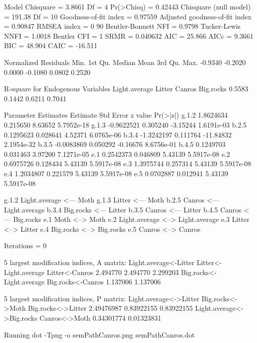 \documentclass[12pt]{article}
\begin{document}
\begin{Schunk}
\begin{Soutput}
 Model Chisquare =  3.8661   Df =  4 Pr(>Chisq) = 0.42443
 Chisquare (null model) =  191.38   Df =  10
 Goodness-of-fit index =  0.97559
 Adjusted goodness-of-fit index =  0.90847
 RMSEA index =  0   90%
 Bentler-Bonnett NFI =  0.9798
 Tucker-Lewis NNFI =  1.0018
 Bentler CFI =  1
 SRMR =  0.040632
 AIC =  25.866
 AICc =  9.3661
 BIC =  48.904
 CAIC =  -16.511

 Normalized Residuals
   Min. 1st Qu.  Median    Mean 3rd Qu.    Max. 
-0.9340 -0.2020  0.0000 -0.1080  0.0802  0.2520 

 R-square for Endogenous Variables
Light.average        Litter        Canros     Big.rocks 
       0.5583        0.1442        0.6211        0.7041 

 Parameter Estimates
      Estimate   Std Error z value   Pr(>|z|)  
g.1.2  1.8624634 0.215650    8.63652 5.7952e-18
g.1.3 -0.9622521 0.305240   -3.15244 1.6191e-03
b.2.5  0.1295623 0.028641    4.52371 6.0765e-06
b.3.4 -1.3242197 0.111764  -11.84832 2.1954e-32
b.3.5 -0.0083869 0.050292   -0.16676 8.6756e-01
b.4.5  0.1249703 0.031463    3.97200 7.1271e-05
e.1    0.2542373 0.046809    5.43139 5.5917e-08
e.2    0.6975726 0.128434    5.43139 5.5917e-08
e.3    1.3975744 0.257314    5.43139 5.5917e-08
e.4    1.2034807 0.221579    5.43139 5.5917e-08
e.5    0.0702887 0.012941    5.43139 5.5917e-08
                                      
g.1.2 Light.average <--- Moth         
g.1.3 Litter <--- Moth                
b.2.5 Canros <--- Light.average       
b.3.4 Big.rocks <--- Litter           
b.3.5 Canros <--- Litter              
b.4.5 Canros <--- Big.rocks           
e.1   Moth <--> Moth                  
e.2   Light.average <--> Light.average
e.3   Litter <--> Litter              
e.4   Big.rocks <--> Big.rocks        
e.5   Canros <--> Canros              

 Iterations =  0 
\end{Soutput}
\begin{Soutput}
 5 largest modification indices, A matrix:
   Light.average<-Litter    Litter<-Light.average           Litter<-Canros 
                2.494770                 2.494770                 2.299203 
Big.rocks<-Light.average        Big.rocks<-Canros 
                1.137006                 1.137006 

  5 largest modification indices, P matrix:
   Light.average<->Litter          Big.rocks<->Moth        Big.rocks<->Litter 
               2.49476987                0.83922155                0.83922155 
Light.average<->Big.rocks             Canros<->Moth 
               0.34301774                0.01323831 
\end{Soutput}
\begin{Soutput}
Running  dot -Tpng -o semPathCanros.png  semPathCanros.dot 
\end{Soutput}
\end{Schunk}
\end{document}
